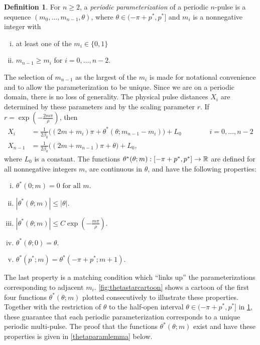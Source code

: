\documentclass[12pt]{elsarticle}
\theoremstyle{plain}
\theoremstyle{definition}
\newtheorem{definition}[theorem]{Definition}
\theoremstyle{remark}
\numberwithin{theorem}{section}
\numberwithin{equation}{section}
\begin{document}
\begin{definition}\label{def:perparam}
For $n \geq 2$, a \emph{periodic parameterization} of a periodic $n$-pulse is a sequence $(m_0, \dots, m_{n-1}, \theta)$, where $\theta \in (-\pi + p^*, p^*]$ and $m_i$ is a nonnegative integer with
\begin{enumerate}[(i)]
\item at least one of the $m_i \in \{0, 1\}$
\item $m_{n-1} \geq m_i$ for $i = 0, \dots, n-2$.
\end{enumerate}
\end{definition}
\noi The selection of $m_{n-1}$ as the largest of the $m_i$ is made for notational convenience and to allow the parameterization to be unique. Since we are on a periodic domain, there is no loss of generality. The physical pulse distances $X_i$ are determined by these parameters and by the scaling parameter $r$. If $r = \exp\left(-\frac{2 m \pi}{\rho}\right)$, then
\begin{align*}
X_i &= \frac{1}{2 \beta_0}\big( (2 m + m_i)\pi + \theta^*(\theta; m_{n-1} - m_i)\big) + L_0 \qquad\qquad i = 0, \dots, n-2  \\
X_{n-1} &= \frac{1}{2 \beta_0}\big( (2 m + m_{n-1})\pi + \theta \big) + L_0,
\end{align*}
where $L_0$ is a constant. 
The functions $\theta^*(\theta; m): [-\pi + p^*, p^*] \rightarrow \mathbb{R}$ are defined for all nonnegative integers $m$, are continuous in $\theta$, and have the following properties:
\begin{enumerate}[(i)]
\item $\theta^*(0; m) = 0 \text{ for all } m$.
\item $|\theta^*(\theta; m)| \leq |\theta|$.
\item $|\theta^*(\theta; m)| \leq C \exp\left(-\frac{m \pi}{\rho} \right)$.
\item $\theta^*(\theta; 0) = \theta $.
\item $\theta^*(p^*; m) = \theta^*(-\pi+p^*; m+1)$.
\end{enumerate}
The last property is a matching condition which ``links up'' the parameterizations corresponding to adjacent $m_i$. \cref{fig:thetastarcartoon} shows a cartoon of the first four functions $\theta^*(\theta; m)$ plotted consecutively to illustrate these properties. Together with the restriction of $\theta$ to the half-open interval $\theta \in (-\pi + p^*, p^*]$ in \cref{def:perparam}, these guarantee that each periodic parameterization corresponds to a unique periodic multi-pulse. The proof that the functions $\theta^*(\theta; m)$ exist and have these properties is given in \cref{thetaparamlemma} below.
\end{document}
